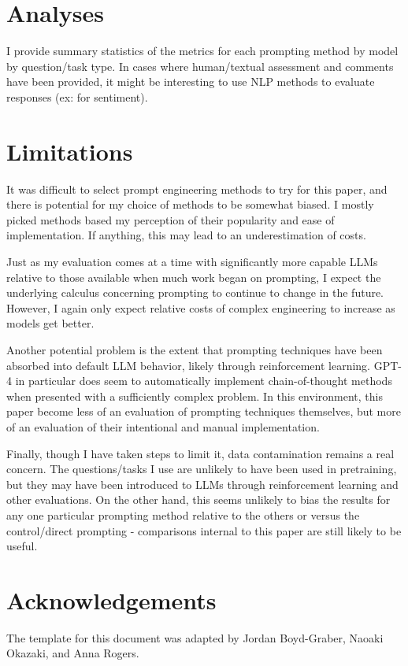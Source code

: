 \documentclass[11pt]{article}
\begin{document}
\section*{Analyses}

I provide summary statistics of the metrics for each prompting method by model by question/task type. In cases where human/textual assessment and comments have been provided, it might be interesting to use NLP methods to evaluate responses (ex: for sentiment).

\section*{Limitations}

It was difficult to select prompt engineering methods to try for this paper, and there is potential for my choice of methods to be somewhat biased. I mostly picked methods based my perception of their popularity and ease of implementation. If anything, this may lead to an underestimation of costs.

Just as my evaluation comes at a time with significantly more capable LLMs relative to those available when much work began on prompting, I expect the underlying calculus concerning prompting to continue to change in the future. However, I again only expect relative costs of complex engineering to increase as models get better.

Another potential problem is the extent that prompting techniques have been absorbed into default LLM behavior, likely through reinforcement learning. GPT-4 in particular does seem to automatically implement chain-of-thought methods when presented with a sufficiently complex problem. In this environment, this paper become less of an evaluation of prompting techniques themselves, but more of an evaluation of their intentional and manual implementation.

Finally, though I have taken steps to limit it, data contamination remains a real concern. The questions/tasks I use are unlikely to have been used in pretraining, but they may have been introduced to LLMs through reinforcement learning and other evaluations. On the other hand, this seems unlikely to bias the results for any one particular prompting method relative to the others or versus the control/direct prompting - comparisons internal to this paper are still likely to be useful.

\section*{Acknowledgements}
The template for this document was adapted by Jordan Boyd-Graber, Naoaki Okazaki, and Anna Rogers.
\end{document}
